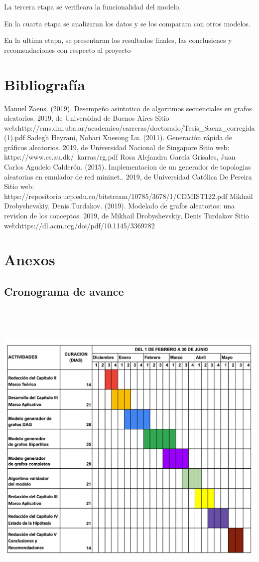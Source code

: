 \documentclass[11pt]{extarticle}
\begin{document}
    La tercera etapa se verificara la funcionalidad del modelo.
    \hfill\break

    En la cuarta etapa se analizaran los datos y se los comparara con 
    otros modelos.
    \hfill\break

    En la ultima etapa, se presentaran los resultados finales, las
    conclusienes y recomendaciones con respecto al proyecto

\section{Bibliograf\'ia}
  Manuel Zaens. (2019). Desempeño asintotico de algoritmos secuenciales en grafos aleatorios. 2019, de Universidad de Buenos Aires Sitio web:\hfill\break http://cms.dm.uba.ar/academico/carreras/doctorado/Tesis\_Saenz\_corregida(1).pdf \hfill \break
  \break
  Sadegh Heyrani, Nobari Xuesong Lu. (2011). Generaci\'on r\'apida de gr\'aficos aleatorios. 2019, de Universidad Nacional de Singapore Sitio web: https://www.cs.au.dk/~karras/rg.pdf
  \break
  \break
  Rosa Alejandra Garc\'ia Grisales, Juan Carlos Agudelo Calder\'on. (2015). Implementacion de un generador de topologias aleatorias en emulador de red mininet.. 2019, de Universidad Cat\'olica De Pereira Sitio web: https://repositorio.ucp.edu.co/bitstream/10785/3678/1/CDMIST122.pdf
  \break
  \break
  Mikhail Drobyshevskiy, Denis Turdakov. (2019). Modelado de grafos aleatorios: una revis\'ion de los conceptos. 2019, de Mikhail Drobyshevskiy, Denis Turdakov Sitio web:\hfill\break https://dl.acm.org/doi/pdf/10.1145/3369782
\section{Anexos}
\subsection{Cronograma de avance}
\includegraphics[width=18cm,height=15cm]{calendario.png}
\end{document}
